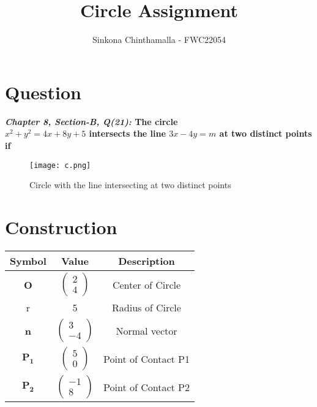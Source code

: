 \documentclass[journal,12pt,twocolumn]{IEEEtran}
\title{\textbf{\\Circle Assignment}}
\author{Sinkona Chinthamalla - FWC22054}
\let\vec\mathbf
\begin{document}
\maketitle

\section{Question}
\textbf{\textit{Chapter 8, Section-B, Q(21):} The circle \\ $ x^2+y^2= 4x+8y+5 $ intersects the line $ 3x-4y = m $ at two distinct points if}

\begin{figure}[h!]
\texttt{[image: c.png]}
\caption{Circle with the line intersecting at two distinct points}
\end{figure}

\section{Construction}
\centering
\vspace{0.2cm}
{
\setlength\extrarowheight{2pt}
\begin{tabular}{|c|c|c|}
	\hline
	\textbf{Symbol}&\textbf{Value}&\textbf{Description}\\
	\hline
	\textbf{O} & 
	$\begin{pmatrix}
     2 \\
     4
    \end{pmatrix}$ & Center of Circle \\
	\hline
	r & 5 & Radius of Circle\\
	\hline
	\textbf{n} & 
	$ \begin{pmatrix}
      3 \\
     -4
    \end{pmatrix}$ & Normal vector\\
	\hline
	$ \vec{P_1}$ & $\begin{pmatrix}
     5 \\
     0
    \end{pmatrix}$ & Point of Contact P1 \\
	\hline
	$ \vec{P_2}$ & $\begin{pmatrix}
     -1 \\
      8
    \end{pmatrix}$ & Point of Contact P2 \\
	\hline
\end{tabular}
}
\end{document}
